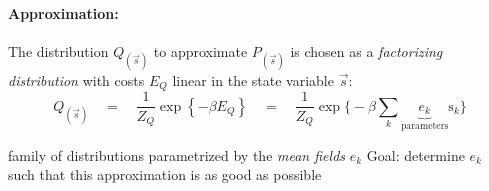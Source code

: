 \paragraph{Approximation:}\label{sec:fact-distr}
The distribution $Q_{(\vec{s})}$ to approximate $P_{(\vec{s})}$ is
chosen as a \emph{factorizing distribution} with costs $E_Q$ linear in
the state variable $\vec{s}$:
\begin{equation}
	Q_{(\vec{s})} \quad
= \quad \frac{1}{Z_Q} \exp \left\{ -\beta E_Q\right\} \quad
= \quad \frac{1}{Z_Q} \exp \Big\{ -\beta \sum\limits_{k}
		\underbrace{ e_k }_{ \text{parameters} } \mathrm{s}_k \Big\}
\end{equation}
\begin{itemize}
	\itr family of distributions parametrized by the \emph{mean fields} $e_k$
      \itr Goal: determine $e_k$ such that this approximation is as good as possible
\end{itemize}

